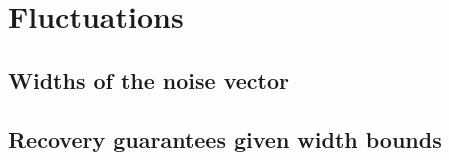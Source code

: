 \section{Fluctuations}

\subsection{Widths of the noise vector}

\subsection{Recovery guarantees given width bounds}
